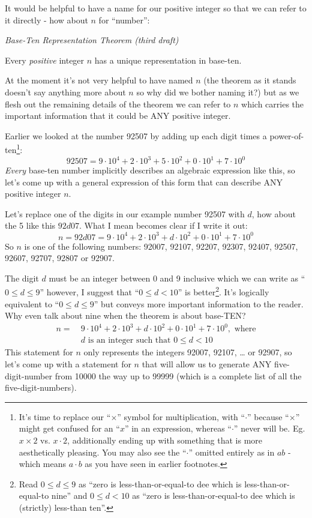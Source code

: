 \documentclass{article}
\newenvironment{jprIn}{\begin{adjustwidth}{2em}{}}{\end{adjustwidth}}
\begin{document}
It would be helpful to have a name for our 
positive integer so that we can refer to it directly - how about $n$ for ``number'':

\emph{Base-Ten Representation Theorem (third draft)}
\begin{jprIn}
Every \emph{positive} integer $n$ has a unique representation in base-ten.
\end{jprIn}

At the moment it's not very helpful to have named $n$ (the theorem as it stands
doesn't say anything more about $n$ so why did we bother naming it?) but
as we flesh out the remaining details of the theorem
we can refer to $n$ which carries the important information that it could be ANY positive integer.

Earlier we looked at the number 92507 by adding up
each digit times a power-of-ten\footnote{It's time
to replace our ``$\times{}$'' symbol for multiplication, with ``$\cdot{}$''
because ``$\times{}$'' might get confused for an ``$x$'' in an expression,
whereas ``$\cdot{}$'' never will be. Eg. $x\times{}2$
vs. $x\cdot{}2$, additionally ending up with something that is more aesthetically pleasing.
You may also see the ``$\cdot$'' omitted entirely as
in $ab$ - which means $a\cdot{}b$ as you have seen in earlier footnotes.}:
\[92507=9{\cdot}10^4+2{\cdot}10^3+5{\cdot}10^2+0{\cdot}10^1+7{\cdot}10^0\]
\emph{Every} base-ten number implicitly describes an algebraic expression like this, so
let's come up
with a general expression of this form that can describe ANY positive integer $n$.

Let's replace one of the digits in our example number 92507 with $d$, how about the 5 like this $92d07$. What I
mean becomes clear if I write it out:
\[n=92d07=9{\cdot}10^4+2{\cdot}10^3+d{\cdot}10^2+0{\cdot}10^1+7{\cdot}10^0\]
So $n$ is one of the following numbers:
92007,
92107,
92207,
92307,
92407,
92507,
92607,
92707,
92807 or
92907.

The digit $d$ must be an integer between 0 and 9 inclusive 
which we can write as ``$0\le{}d\le{}9$'' however, I suggest that ``$0\le{}d<10$'' is better\footnote{Read 
$0\le{}d\le{}9$ as ``zero is less-than-or-equal-to dee which is less-than-or-equal-to nine''
and $0\le{}d<10$ as ``zero is less-than-or-equal-to dee which is (strictly) less-than ten''.}.
It's logically equivalent to ``$0\le{}d\le{}9$''  but conveys more important information
to the reader. Why even talk about nine when the theorem is about base-TEN?
\begin{align*}
n =\ &9{\cdot}10^4+2{\cdot}10^3+d{\cdot}10^2+0{\cdot}10^1+7{\cdot}10^0,\text{ where}\\
&d\text{ is an integer such that }0\le{}d<10
\end{align*}
This statement for $n$ only represents the integers 92007, 92107, \dots{} or 92907, so let's come up
with a statement for $n$ that will allow us to generate ANY five-digit-number from 10000 
the way up to 99999 (which is a complete list of all the five-digit-numbers).
\end{document}
